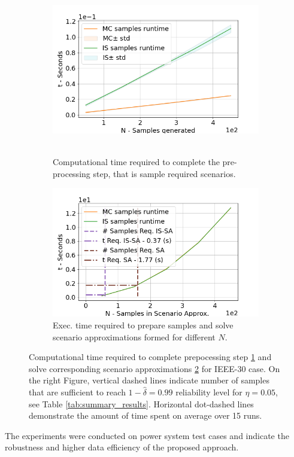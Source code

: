 \begin{figure}[hbt]

\begin{subfigure}{.48\textwidth}
  \centering
  \hspace{-4mm}\includegraphics[width=0.9\linewidth]{Dissertation/images/dc_stochastic_approx/profiling_samplig.png}~~~~~~\hfill
  \caption{Computational time required to complete the pre-processing step, that is sample required scenarios.}
  \label{fig:profile_generate_samples}
\end{subfigure}
\begin{subfigure}{.48\textwidth}
  \centering
  \includegraphics[width=0.9\linewidth]{Dissertation/images/dc_stochastic_approx/profiling_approx_sol.png}
  \caption{Exec. time required to prepare samples and solve scenario approximations formed for different $N$.}
  \label{fig:profile_scenario_approx}
\end{subfigure}

\caption{Computational time required to complete prepocessing step \ref{fig:profile_generate_samples} and solve corresponding scenario approximations \ref{fig:profile_scenario_approx} for IEEE-30 case. On the right Figure, vertical dashed lines indicate number of samples that are sufficient to reach $1-\hat{\delta}=0.99$ reliability level for $\eta=0.05$, see Table \ref{tab:summary_results}. Horizontal dot-dashed lines demonstrate the amount of time spent on average over 15 runs.}
\label{fig:profiling}

\end{figure}
The experiments were conducted on power system test cases and indicate the robustness and higher data efficiency of the proposed approach.

